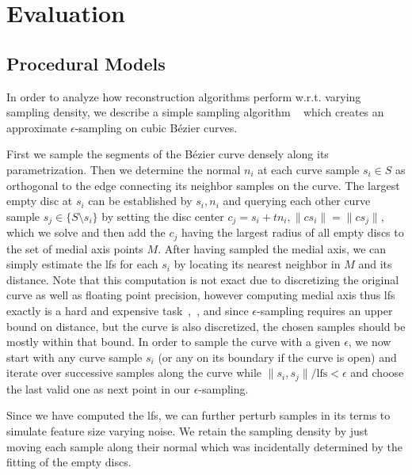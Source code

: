 
\section{Evaluation}
\TODO

\subsection{Procedural Models}
\label{sec:sampling}

In order to analyze how reconstruction algorithms perform w.r.t. varying sampling density, we describe a simple sampling algorithm ~\cite{ohrhallinger2016hnn} which creates an approximate $\epsilon$-sampling on cubic B{\'e}zier curves.

First we sample the segments of the B{\'e}zier curve densely along its parametrization.
Then we determine the normal $n_i$ at each curve sample $s_i \in S$ as orthogonal to the edge connecting its neighbor samples on the curve.
The largest empty disc at $s_i$ can be established by $s_i, n_i$ and querying each other curve sample $s_j \in \{S \setminus s_i\}$ by setting the disc center $c_j=s_i+tn_i,\|cs_i\|=\|cs_j\|$, which we solve and then add the $c_j$ having the largest radius of all empty discs to the set of medial axis points $M$.
After having sampled the medial axis, we can simply estimate the lfs for each $s_i$ by locating its nearest neighbor in $M$ and its distance.
Note that this computation is not exact due to discretizing the original curve as well as floating point precision, however computing medial axis thus lfs exactly is a hard and expensive task~\cite{aichholzer09medialaxis},~\cite{attali09medialaxis}, and since $\epsilon$-sampling requires an upper bound on distance, but the curve is also discretized, the chosen samples should be mostly within that bound.
In order to sample the curve with a given $\epsilon$, we now start with any curve sample $s_i$ (or any on its boundary if the curve is open) and iterate over successive samples along the curve while $\|s_i,s_j\|/\mbox{lfs}<\epsilon$ and choose the last valid one as next point in our $\epsilon$-sampling.

Since we have computed the lfs, we can further perturb samples in its terms to simulate feature size varying noise.
We retain the sampling density by just moving each sample along their normal which was incidentally determined by the fitting of the empty discs.

